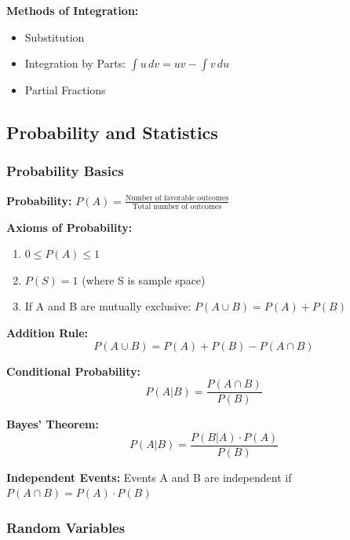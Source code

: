 \documentclass[11pt,a4paper]{article}
\begin{document}
\textbf{Methods of Integration:}
\begin{itemize}
    \item Substitution
    \item Integration by Parts: $\int u \, dv = uv - \int v \, du$
    \item Partial Fractions
\end{itemize}

\subsection{Probability and Statistics}

\subsubsection{Probability Basics}

\begin{defbox}
\textbf{Probability:} $P(A) = \frac{\text{Number of favorable outcomes}}{\text{Total number of outcomes}}$
\end{defbox}

\textbf{Axioms of Probability:}
\begin{enumerate}
    \item $0 \leq P(A) \leq 1$
    \item $P(S) = 1$ (where S is sample space)
    \item If A and B are mutually exclusive: $P(A \cup B) = P(A) + P(B)$
\end{enumerate}

\begin{formulabox}
\textbf{Addition Rule:}
\[
    P(A \cup B) = P(A) + P(B) - P(A \cap B)
\]
\end{formulabox}

\begin{formulabox}
\textbf{Conditional Probability:}
\[
    P(A|B) = \frac{P(A \cap B)}{P(B)}
\]
\end{formulabox}

\begin{formulabox}
\textbf{Bayes' Theorem:}
\[
    P(A|B) = \frac{P(B|A) \cdot P(A)}{P(B)}
\]
\end{formulabox}

\begin{defbox}
\textbf{Independent Events:} Events A and B are independent if $P(A \cap B) = P(A) \cdot P(B)$
\end{defbox}

\subsubsection{Random Variables}
\end{document}
